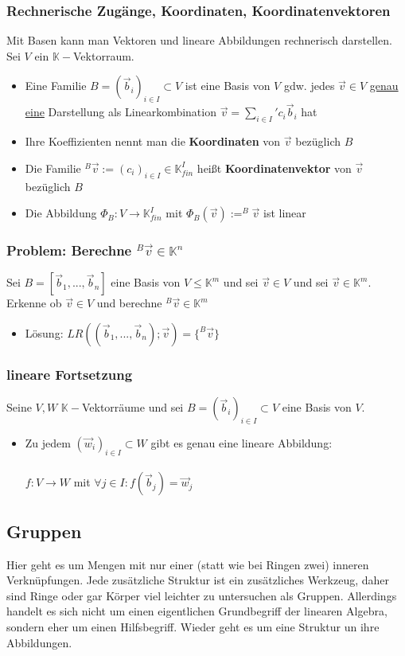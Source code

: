 \documentclass[titlepage]{article}
\newcommand{\K}{\mathbb{K}}
\newcommand{\1}{\mathbb{1}}
\newcommand{\0}{\mathbb{0}}
\begin{document}
				\subsubsection{Rechnerische Zugänge, Koordinaten, Koordinatenvektoren}
					Mit Basen kann man Vektoren und lineare Abbildungen rechnerisch darstellen.
					\\
					Sei $V$ ein $\K-$Vektorraum.
					\begin{itemize}
						\item Eine Familie $B=(\vec{b}_i)_{i\in I}\subset V$ ist eine Basis von $V$ gdw. jedes $\vec{v}\in V$ \underline{genau eine} Darstellung als Linearkombination $\vec{v}=\sum\limits_{i\in I}\text{$'$}c_i\vec{b}_i$ hat
						\item Ihre Koeffizienten nennt man die \textbf{Koordinaten} von $\vec{v}$ bezüglich $B$
						\item Die Familie $^B\vec{v}:=(c_i)_{i\in I}\in\K^I_{fin}$ heißt \textbf{Koordinatenvektor} von $\vec{v}$ bezüglich $B$
						\item Die Abbildung $\Phi_B:V\rightarrow\K^I_{fin}$ mit $\Phi_B(\vec{v}):=^B\vec{v}$ ist linear
					\end{itemize}
				\subsubsection{Problem: Berechne $^B\vec{v}\in\K^n$}
					Sei $B=[\vec{b}_1,...,\vec{b}_n]$ eine Basis von $V\le\K^m$ und sei $\vec{v}\in V$ und sei $\vec{v}\in\K^m$. Erkenne ob $\vec{v}\in V$ und berechne $^B\vec{v}\in\K^m$
					\begin{itemize}
						\item Lösung: $LR\left((\vec{b}_1,...,\vec{b}_n);\vec{v}\right)=\{^B\vec{v}\}$
					\end{itemize}
				\subsubsection{lineare Fortsetzung}
					Seine $V,W$ $\K-$Vektorräume und sei $B=(\vec{b}_i)_{i\in I}\subset V$ eine Basis von $V$.
					\begin{itemize}
						\item Zu jedem $(\vec{w}_i)_{i\in I}\subset W$ gibt es genau eine lineare Abbildung:\\\\
						$f:V\rightarrow W$ mit $\forall j\in I:f(\vec{b}_j)=\vec{w}_j$
					\end{itemize}
			\subsection{Gruppen}
				Hier geht es um Mengen mit nur einer (statt wie bei Ringen zwei) inneren Verknüpfungen. Jede zusätzliche Struktur ist ein zusätzliches Werkzeug, daher sind Ringe oder gar Körper viel leichter zu untersuchen als Gruppen. Allerdings handelt es sich nicht um einen eigentlichen Grundbegriff der linearen Algebra, sondern eher um einen Hilfsbegriff. Wieder geht es um eine Struktur un ihre Abbildungen.
\end{document}
